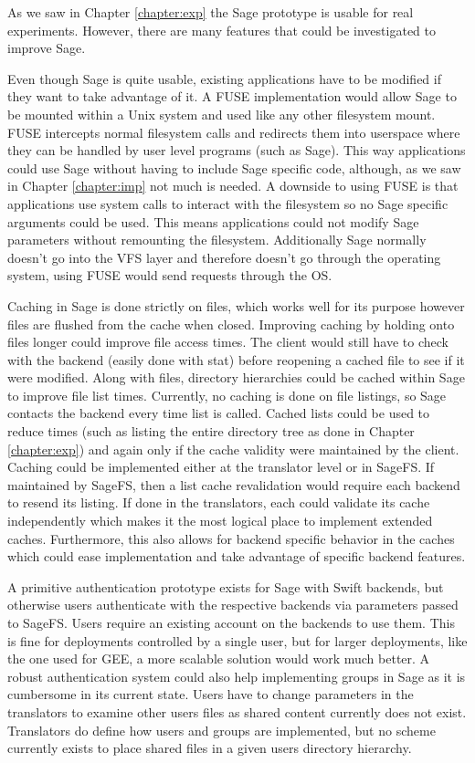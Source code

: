As we saw in Chapter \ref{chapter:exp} the Sage prototype is usable for real
experiments. However, there are many features that could be investigated to
improve Sage.

Even though Sage is quite usable, existing applications have to be modified if
they want to take advantage of it. A FUSE implementation would allow Sage to
be mounted within a Unix system and used like any other filesystem mount. FUSE
intercepts normal filesystem calls  and redirects them into userspace where
they can be handled by user level programs (such as Sage). This way
applications could use Sage without having to include Sage specific code,
although, as we saw in Chapter \ref{chapter:imp} not much is needed. A
downside to using FUSE is that applications use system calls to interact with
the filesystem so no Sage specific arguments could be used. This means
applications could not modify Sage parameters without remounting the
filesystem. Additionally Sage normally doesn’t go into the VFS layer and
therefore doesn’t go through the operating system, using FUSE would send
requests through the OS.

Caching in Sage is done strictly on files, which works well for its purpose
however files are flushed from the cache when closed. Improving caching by
holding onto files longer could improve file access times. The client would
still have to check with the backend (easily done with stat) before reopening
a cached file to see if it were modified. Along with files, directory
hierarchies could be cached within Sage to improve file list times. Currently,
no caching is done on file listings, so Sage contacts the backend every time
list is called. Cached lists could be used to reduce times (such as listing
the entire directory tree as done in Chapter \ref{chapter:exp}) and again only
if the cache validity were maintained by the client. Caching could be
implemented either at the translator level or in SageFS. If maintained by
SageFS, then a list cache revalidation would require each backend to resend
its listing. If done in the translators, each could validate its cache
independently which makes it the most logical place to implement extended
caches. Furthermore, this also allows for backend specific behavior in the
caches which could ease implementation and take advantage of specific backend
features.

A primitive authentication prototype exists for Sage with Swift backends, but
otherwise users authenticate with the respective backends via parameters
passed to SageFS. Users require an existing account on the backends to use
them. This is fine for deployments controlled by a single user, but for larger
deployments, like the one used for GEE, a more scalable solution would work
much better. A robust authentication system could also help implementing
groups in Sage as it is cumbersome in its current state. Users have to change
parameters in the translators to examine other users files as shared content
currently does not exist. Translators do define how users and groups are
implemented, but no scheme currently exists to place shared files in a given
users directory hierarchy.

